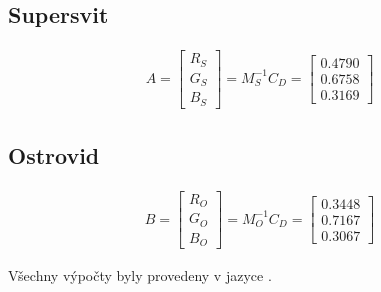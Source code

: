 \documentclass[11pt,a4paper]{article}
\begin{document}
\subsection{Supersvit}
\begin{align}
    A = \begin{bmatrix} R_S \\ G_S \\ B_S \end{bmatrix} = M_S^{-1} C_{D} = 
    \begin{bmatrix} 0.4790 \\ 0.6758 \\ 0.3169 \end{bmatrix}
\end{align}

\subsection{Ostrovid}
\begin{align}
    B = \begin{bmatrix} R_O \\ G_O \\ B_O \end{bmatrix} = M_O^{-1} C_{D} = 
    \begin{bmatrix} 0.3448 \\ 0.7167 \\ 0.3067 \end{bmatrix}
\end{align}

\vspace{4em}
Všechny výpočty byly provedeny v jazyce 
.
\end{document}
